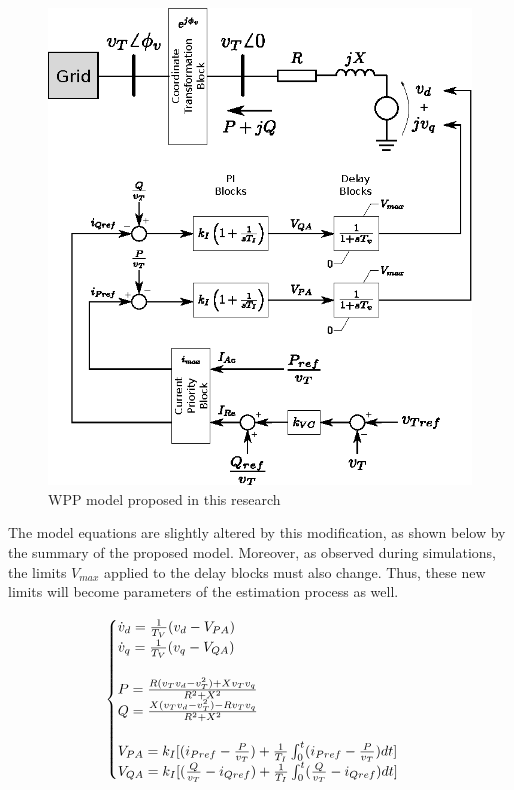 \begin{figure}[h]
	\caption{WPP model proposed in this research}
	\begin{center}
		\includegraphics[scale=1]{Images/proposed_model.eps}
	\end{center}
	\label{fig: Proposed_Model}
\end{figure}

The model equations are slightly altered by this modification, as shown below by the summary of the proposed model. Moreover, as observed during simulations, the limits $V_{max}$ applied to the delay blocks must also change. Thus, these new limits will become parameters of the estimation process as well.

\begin{equation}
	\begin{cases}
		\dot{v}_{d} = \frac{1}{T_{V}}(v_{d} - V_{PA}) \\
		\dot{v}_{q} = \frac{1}{T_{V}}(v_{q} - V_{QA}) \\
		\\
		P = \frac{R(v_{T}v_{d} - v_{T}^{2}) + Xv_{T}v_{q}}{R^{2} + X^{2}} \\
		Q = \frac{X(v_{T}v_{d} - v_{T}^{2}) - Rv_{T}v_{q}}{R^{2} + X^{2}} \\
		\\
		V_{PA} = k_{I}[(i_{Pref} - \frac{P}{v_{T}}) + \frac{1}{T_{I}}\int\displaylimits_{0}^{t} (i_{Pref} - \frac{P}{v_{T}})dt]\\
		V_{QA} = k_{I}[(\frac{Q}{v_{T}} - i_{Qref}) + \frac{1}{T_{I}}\int\displaylimits_{0}^{t} (\frac{Q}{v_{T}} - i_{Qref})dt]
	\end{cases}
	\label{eq: summary_proposed}
\end{equation}

